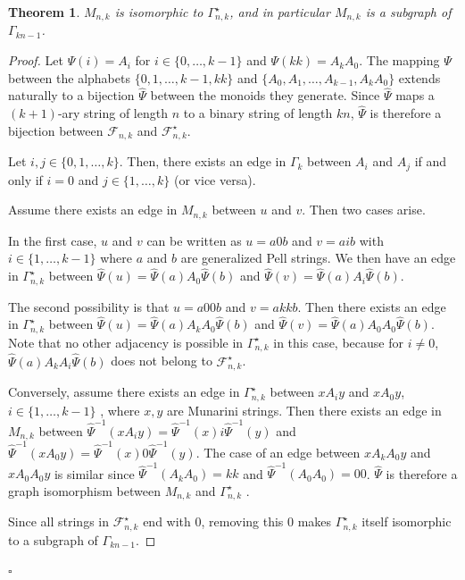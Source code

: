\documentclass[11pt]{article}
\newtheorem{theorem}{\bf Theorem}[section]
\newcommand{\qed}{\hfill $\square$ \bigskip}
\newcommand{\Fib}{{\mathcal F}}
\begin{document}
\begin{theorem}\label{th:isoembed}
$M_{n,k}$ is isomorphic to $\Gamma_{n,k}^\star$, and in particular $M_{n,k}$ is a subgraph of $\Gamma_{kn-1}$.
\end{theorem}
\begin{proof}
Let $\Psi(i)=A_i$ for $i\in\{0,\ldots,k-1\}$ and $\Psi(kk)=A_kA_0$. The mapping $\Psi$ between the alphabets $\{0,1,\ldots,k-1,kk\}$ and $\{A_0,A_1,\ldots,A_{k-1},A_kA_0\}$  extends naturally to a bijection $\widehat{\Psi}$ between the monoids they generate. Since $\widehat{\Psi}$ maps a $(k+1)$-ary string of length $n$ to a binary string of length $kn$, $\widehat{\Psi}$ is therefore a bijection between $\Fib_{n,k}$ and $\Fib_{n,k}^\star$. 

Let $i,j\in\{0,1,\ldots,k\}$. Then, there exists an edge in $\Gamma_k$ between $A_i$ and $A_j$ if and only if $i=0$ and $j\in\{1,\ldots,k\}$ (or vice versa). 

Assume there exists an edge in $M_{n,k}$ between $u$ and $v$. Then two cases arise.

In the first case,  $u$ and $v$ can be written as  $u=a0b$ and $v=aib$ with $i\in\{1,\ldots,k-1\}$ where $a$ and $b$ are generalized Pell strings. We then have an edge in $\Gamma_{n,k}^\star$ between 
$\widehat{\Psi}(u)=\widehat{\Psi}(a)A_0\widehat{\Psi}(b)$ and $\widehat{\Psi}(v)=\widehat{\Psi}(a)A_i\widehat{\Psi}(b)$.

The second possibility is that $u=a00b$ and $v=akkb$. Then there exists an edge in $\Gamma_{n,k}^\star$ between 
$\widehat{\Psi}(u)=\widehat{\Psi}(a)A_kA_0\widehat{\Psi}(b)$ and $\widehat{\Psi}(v)=\widehat{\Psi}(a)A_0A_0\widehat{\Psi}(b)$. Note that no other adjacency is possible in $\Gamma_{n,k}^\star$ in this case, because for $i\neq0$, $\widehat{\Psi}(a)A_kA_i\widehat{\Psi}(b)$ does not belong to $\Fib_{n,k}^\star$. 
  
Conversely, assume there exists an edge in $\Gamma_{n,k}^\star$	between $xA_iy$ and $xA_0y$, $i\in\{1,\ldots,k-1\}$ , where $x,y$ are  Munarini strings. Then there exists an edge in $M_{n,k}$ between $\widehat{\Psi}^{-1}(xA_iy)=\widehat{\Psi}^{-1}(x)i\widehat{\Psi}^{-1}(y)$ and $\widehat{\Psi}^{-1}(xA_0y)=\widehat{\Psi}^{-1}(x)0\widehat{\Psi}^{-1}(y)$. The case of an edge between $xA_kA_0y$ and $xA_0A_0y$ is similar since $\widehat{\Psi}^{-1}(A_kA_0)=kk$ and $\widehat{\Psi}^{-1}(A_0A_0)=00$.
$\widehat{\Psi}$ is therefore a graph isomorphism between $M_{n,k}$ and $\Gamma_{n,k}^\star$ .

Since all strings in $\Fib_{n,k}^\star$ end with 0, removing this 0 makes $\Gamma_{n,k}^\star$ itself isomorphic to a subgraph of $\Gamma_{kn-1}$.
\end{proof}
\qed
\end{document}
